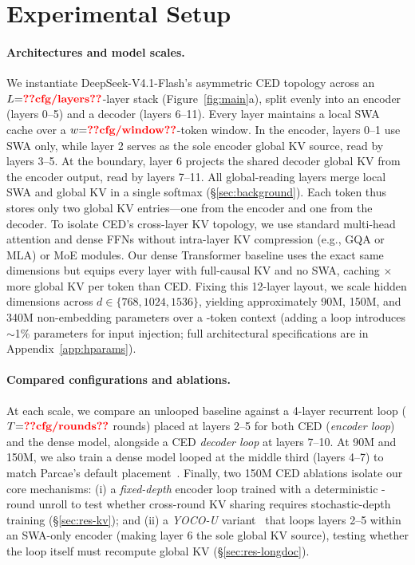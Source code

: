 \section{Experimental Setup}
\label{sec:setup}

\paragraph{Architectures and model scales.} 
We instantiate DeepSeek-V4.1-Flash's asymmetric CED topology across an $L{=}\val{cfg/layers}$-layer stack (Figure~\ref{fig:main}a), split evenly into an encoder (layers 0--5) and a decoder (layers 6--11). Every layer maintains a local SWA cache over a $w{=}\val{cfg/window}$-token window. In the encoder, layers 0--1 use SWA only, while layer 2 serves as the sole encoder global KV source, read by layers 3--5. At the boundary, layer 6 projects the shared decoder global KV from the encoder output, read by layers 7--11. All global-reading layers merge local SWA and global KV in a single softmax (\S\ref{sec:background}). Each token thus stores only two global KV entries—one from the encoder and one from the decoder. 
To isolate CED's cross-layer KV topology, we use standard multi-head attention and dense FFNs without intra-layer KV compression (e.g., GQA or MLA) or MoE modules.
Our dense Transformer baseline uses the exact same dimensions but equips every layer with full-causal KV and no SWA, caching $\times$ more global KV per token than CED. Fixing this 12-layer layout, we scale hidden dimensions across $d \in \{768, 1024, 1536\}$, yielding approximately 90M, 150M, and 340M non-embedding parameters over a -token context (adding a loop introduces $\sim$1\% parameters for input injection; full architectural specifications are in Appendix~\ref{app:hparams}).

\paragraph{Compared configurations and ablations.} 
At each scale, we compare an unlooped baseline against a 4-layer recurrent loop ($T{=}\val{cfg/rounds}$ rounds) placed at layers 2--5 for both CED (\emph{encoder loop}) and the dense model, alongside a CED \emph{decoder loop} at layers 7--10. At 90M and 150M, we also train a dense model looped at the middle third (layers 4--7) to match Parcae's default placement~\citep{parcae}. Finally, two 150M CED ablations isolate our core mechanisms: (i) a \emph{fixed-depth} encoder loop trained with a deterministic -round unroll to test whether cross-round KV sharing requires stochastic-depth training (\S\ref{sec:res-kv}); and (ii) a \emph{YOCO-U} variant~\citep{yocou} that loops layers 2--5 within an SWA-only encoder (making layer 6 the sole global KV source), testing whether the loop itself must recompute global KV (\S\ref{sec:res-longdoc}).

